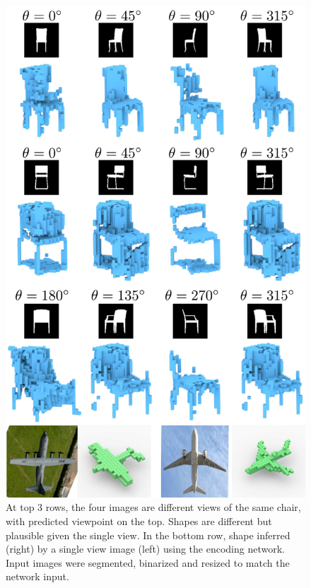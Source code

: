 \begin{figure}[t]
	\centering
	\includegraphics[width=0.85\linewidth]{fig/shapepred.pdf}
	\caption{\label{fig:sp} 
	At top 3 rows, the four images are different views of the same chair, with predicted viewpoint on the top. 
	Shapes are different but plausible given the single view.
	In the bottom row, shape inferred (right) by a single view image (left) using the encoding network. 
	Input images were segmented, binarized and resized to match the network input.}
\end{figure}


